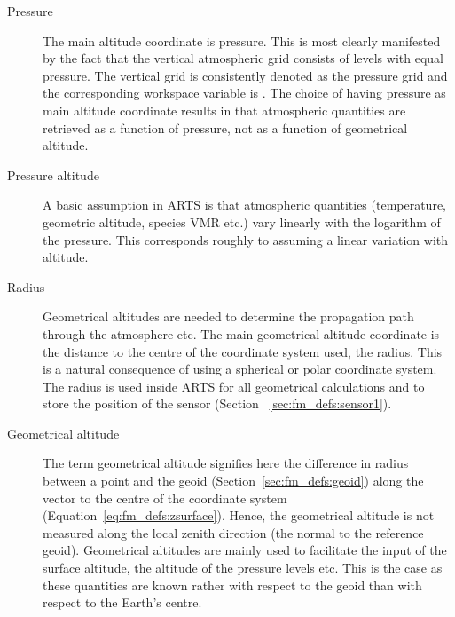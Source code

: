 \begin{description}
  
\item[Pressure] The main altitude coordinate is
  pressure. This is most clearly manifested by the fact that the
  vertical atmospheric grid consists of levels with equal pressure.
  The vertical grid is consistently denoted as the pressure grid and
  the corresponding workspace variable is . The
  choice of having pressure as main altitude coordinate results in
  that atmospheric quantities are retrieved as a function of pressure,
  not as a function of geometrical altitude.
  
\item[Pressure altitude] A basic assumption
  in ARTS is that atmospheric quantities (temperature, geometric
  altitude, species VMR etc.) vary linearly with the logarithm of the
  pressure. This corresponds roughly to assuming a linear variation
  with altitude. 
  
\item[Radius] Geometrical altitudes are
  needed to determine the propagation path through the atmosphere etc.
  The main geometrical altitude coordinate is the distance to the
  centre of the coordinate system used, the radius. This is a natural
  consequence of using a spherical or polar coordinate system. The
  radius is used inside ARTS for all geometrical calculations and to
  store the position of the sensor (Section~
  \ref{sec:fm_defs:sensor1}).
  
\item[Geometrical altitude] The term
  geometrical altitude signifies here the difference in radius between
  a point and the geoid (Section~\ref{sec:fm_defs:geoid}) along the
  vector to the centre of the coordinate system
  (Equation~\ref{eq:fm_defs:zsurface}). Hence, the geometrical altitude
  is not measured along the local zenith direction (the normal to the
  reference geoid). Geometrical altitudes are mainly used to
  facilitate the input of the surface altitude, the altitude of the
  pressure levels etc. This is the case as these quantities are known
  rather with respect to the geoid than with respect to the Earth's
  centre.

\end{description}
